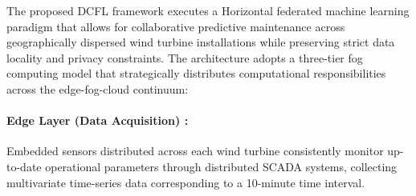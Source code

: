 \documentclass[12pt]{article}
\begin{document}

    
    

The proposed DCFL framework executes a Horizontal federated machine learning paradigm that allows for collaborative predictive maintenance across geographically dispersed wind turbine installations while preserving strict data locality and privacy constraints. The architecture adopts a three-tier fog computing model that strategically distributes computational responsibilities across the edge-fog-cloud continuum:
\vspace{-0.4cm}
\paragraph{Edge Layer (Data Acquisition) :} Embedded sensors distributed across each wind turbine consistently monitor up-to-date operational parameters through distributed SCADA systems, collecting multivariate time-series data corresponding to a 10-minute time interval.
\vspace{-0.4cm}
\end{document}
